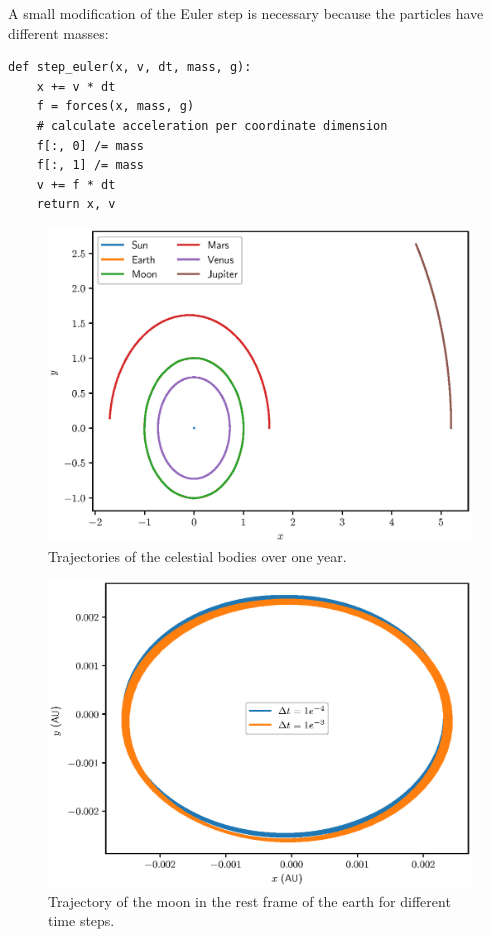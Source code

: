\documentclass[a4paper,10pt,bibtotoc]{scrartcl}
\begin{document}
A small modification of the Euler step is necessary because the particles have different masses:
\begin{lstlisting}
def step_euler(x, v, dt, mass, g):
    x += v * dt
    f = forces(x, mass, g)
    # calculate acceleration per coordinate dimension
    f[:, 0] /= mass
    f[:, 1] /= mass
    v += f * dt
    return x, v
\end{lstlisting}




\begin{figure}[t]
 \includegraphics{Figure_4.eps}
 \caption{Trajectories of the celestial bodies over one year.}
 \label{fig:fig4}
\end{figure}

\begin{figure}[h]
\centering
 \includegraphics[width=\textwidth]{moon_trajectory.eps}
 \caption{Trajectory of the moon in the rest frame of the earth for different time steps.}
 \label{fig:moon_trajectory}
\end{figure}
\end{document}
